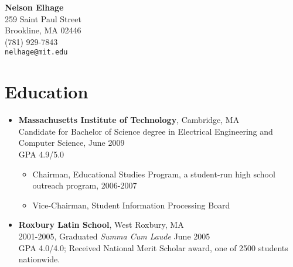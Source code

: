 \documentclass[letterpaper,10pt]{article}
\begin{document}
\begin{center}
  {\LARGE \bf Nelson Elhage}\\
  {\large
    259 Saint Paul Street \\
    Brookline, MA 02446 \\
    (781) 929-7843 \\
    \mbox{\small \tt nelhage@mit.edu}}
\end{center}

\section*{Education}
\vspace*{-0.2cm}
\begin{itemize}
  \item \textbf{Massachusetts Institute of Technology}, Cambridge, MA
    \\ Candidate for Bachelor of Science degree in Electrical
    Engineering and Computer Science, June 2009 \\
    GPA 4.9/5.0
    \vspace*{-0.2cm}
    \begin{itemize}
      \item Chairman, Educational Studies Program, a student-run
        high school outreach program, 2006-2007
      \item Vice-Chairman, Student Information Processing Board
    \end{itemize}
  \item \textbf{Roxbury Latin School}, West Roxbury, MA \\ 2001-2005,
    Graduated {\em Summa Cum Laude} June 2005 \\
    GPA 4.0/4.0;
    Received National Merit Scholar award, one of 2500 students nationwide.
\end{itemize}

\vspace*{-0.7cm}
\end{document}
